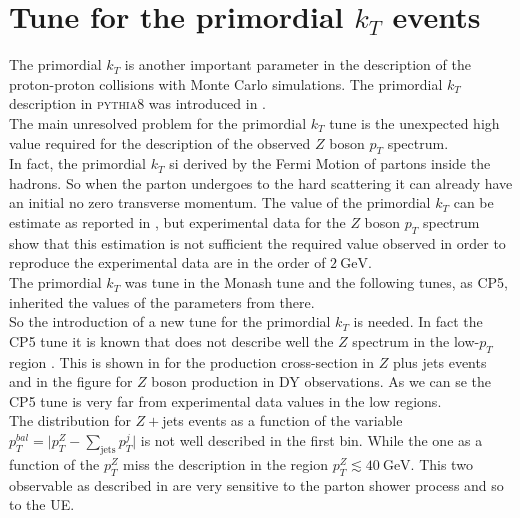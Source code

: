 \chapter{Tune for the primordial $k_T$ events}
\label{chap:primordialkTtune}

The primordial $k_T$ is another important parameter in the description of the proton-proton collisions with Monte Carlo simulations. The primordial $k_T$ description in \textsc{pythia8} was introduced in .
\\
The main unresolved problem for the primordial $k_T$ tune is the unexpected high value required for the description of the observed $Z$ boson $p_T$ spectrum.
\\
In fact, the primordial $k_T$ si derived by the Fermi Motion of partons inside the hadrons. So when the parton undergoes to the hard scattering it can already have an initial no zero transverse momentum.
The value of the primordial $k_T$ can be estimate as reported in , but experimental data for the $Z$ boson $p_T$ spectrum show that this estimation is not sufficient the required value observed in order to reproduce the experimental data are in the order of $2\ \mathrm{GeV}$.
\\
%
The primordial $k_T$ was tune in the Monash tune \cite{Monash} and the following tunes, as CP5, inherited the values of the parameters from there.
\\
So the introduction of a new tune for the primordial $k_T$ is needed. In fact the CP5 tune it is known that does not describe well the $Z$ spectrum in the low-$p_T$ region \cite{CPtunes}. This is shown in  for the production cross-section in $Z$ plus jets events and in the figure  for $Z$ boson production in DY observations. As we can se the CP5 tune is very far from experimental data values in the low regions. 
\\
The distribution for $Z+$jets events as a function of the variable $p_T^{bal}=\big|p_T^Z-\sum_{\text{jets}}p_T^{j}\big|$ is not well described in the first bin. While the one as a function of the $p_T^Z$ miss the description in the region $p_T^Z \lesssim 40\ \mathrm{GeV}$. This two observable as described in \cite{CPtunes} are very sensitive to the parton shower process and so to the UE.
